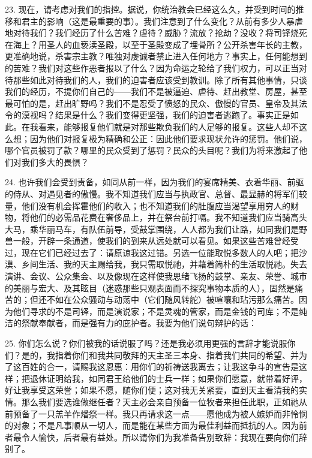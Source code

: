 23. 现在，请考虑对我们的指控。据说，你统治教会已经这么久，并受到时间的推移和君主的影响（这是最重要的事）。我们注意到了什么变化？从前有多少人暴虐地对待我们？我们经历了什么苦难？虐待？威胁？流放？抢劫？没收？将司铎烧死在海上？用圣人的血亵渎圣殿，以至于圣殿变成了埋骨所？公开杀害年长的主教，更准确地说，杀害宗主教？唯独对虔诚者禁止进入任何地方？事实上，任何能想到的苦难？我们对这些作恶者报以了什么？因为命运之轮给了我们权力，可以正当对待那些如此对待我们的人，我们的迫害者应该受到教训。除了所有其他事情，只谈我们的经历，不提你们自己的——我们不是被逼迫、虐待、赶出教堂、房屋，甚至最可怕的是，赶出旷野吗？我们不是忍受了愤怒的民众、傲慢的官员、皇帝及其法令的漠视吗？结果是什么？我们变得更坚强，我们的迫害者逃跑了。事实正是如此。在我看来，能够报复他们就是对那些欺负我们的人足够的报复。这些人却不这么想；因为他们对报复极为精确和公正：因此他们要求现状允许的惩罚。他们说，哪个官员被罚了款？哪里的民众受到了惩罚？民众的头目呢？我们为将来激起了他们对我们多大的畏惧？\par

24. 也许我们会受到责备，如同从前一样，因为我们的宴席精美、衣着华丽、前驱的侍从、对遇见者的傲慢。我不知道我们应当与执政官、总督、最显赫的将军们较量，他们没有机会挥霍他们的收入；也不知道我们的肚腹应当渴望享用穷人的财物，将他们的必需品花费在奢侈品上，并在祭台前打嗝。我不知道我们应当骑高头大马，乘华丽马车，有队伍前导，受鼓掌围绕，人人都为我们让路，如同我们是野兽一般，开辟一条通道，使我们的到来从远处就可以看见。如果这些苦难曾经受过，现在它们已经过去了：请原谅我这过错。另选一位能取悦多数人的人吧；把沙漠、乡间生活、我的天主赐给我，我只需取悦祂，并藉着简朴的生活取悦祂。失去演讲、会议、公众集会、以及像现在这样使我思绪飞扬的鼓掌、亲友、荣誉、城市的美丽与宏大、及其眩目（迷惑那些只观表面而不探究事物本质的人），固然是痛苦的；但还不如在公众骚动与动荡中（它们随风转舵）被喧嚷和玷污那么痛苦。因为他们寻求的不是司铎，而是演说家；不是灵魂的管家，而是金钱的司库；不是纯洁的祭献奉献者，而是强有力的庇护者。我要为他们说句辩护的话：\par

25. 你们怎么说？你们被我的话说服了吗？还是我必须用更强的言辞才能说服你们？是的，我指着你们和我共同敬拜的天主圣三本身、指着我们共同的希望、并为了这百姓的合一，请赐我这恩惠：用你们的祈祷送我离去；让我这争斗的宣告是这样；把退休证明给我，如同君王给他们的士兵一样；如果你们愿意，就带着好评，好让我享受这荣誉；如果不愿，随你们便；这对我无关紧要，直到天主看清我的实情。那么我们要选谁做继任者？天主必会亲自预备一位牧者来担任此职，正如祂从前预备了一只羔羊作燔祭一样。我只再请求这一点——愿他成为被人嫉妒而非怜悯的对象；不是凡事顺从一切人，而是能在某些方面为最佳利益而抵抗的人。因为前者最令人愉快，后者最有益处。所以请你们为我准备告别致辞：我现在要向你们辞别了。\par

